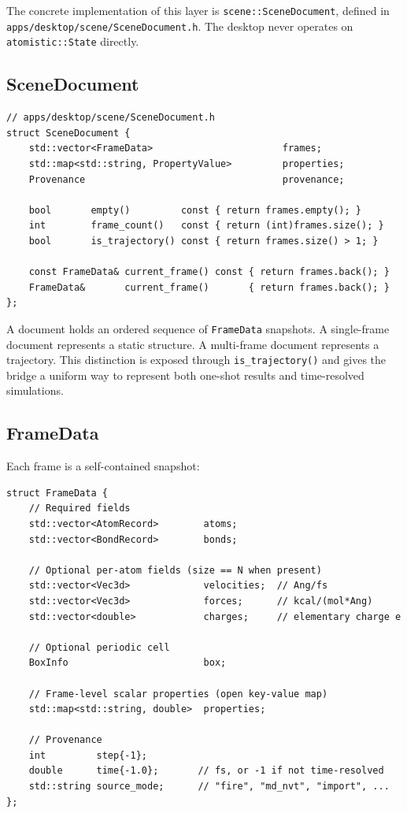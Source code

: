 ﻿\documentclass[11pt]{article}
\newcommand{\file}[1]{\texttt{#1}}
\newcommand{\type}[1]{\texttt{#1}}
\newcommand{\op}[1]{\texttt{#1}}
\begin{document}
The concrete implementation of this layer is \type{scene::SceneDocument},
defined in \file{apps/desktop/scene/SceneDocument.h}. The desktop never
operates on \type{atomistic::State} directly.

\subsection{SceneDocument}

\begin{lstlisting}
// apps/desktop/scene/SceneDocument.h
struct SceneDocument {
    std::vector<FrameData>                       frames;
    std::map<std::string, PropertyValue>         properties;
    Provenance                                   provenance;

    bool       empty()         const { return frames.empty(); }
    int        frame_count()   const { return (int)frames.size(); }
    bool       is_trajectory() const { return frames.size() > 1; }

    const FrameData& current_frame() const { return frames.back(); }
    FrameData&       current_frame()       { return frames.back(); }
};
\end{lstlisting}

A document holds an ordered sequence of \type{FrameData} snapshots. A
single-frame document represents a static structure. A multi-frame document
represents a trajectory. This distinction is exposed through
\op{is\_trajectory()} and gives the bridge a uniform way to represent both
one-shot results and time-resolved simulations.

\subsection{FrameData}

Each frame is a self-contained snapshot:

\begin{lstlisting}
struct FrameData {
    // Required fields
    std::vector<AtomRecord>        atoms;
    std::vector<BondRecord>        bonds;

    // Optional per-atom fields (size == N when present)
    std::vector<Vec3d>             velocities;  // Ang/fs
    std::vector<Vec3d>             forces;      // kcal/(mol*Ang)
    std::vector<double>            charges;     // elementary charge e

    // Optional periodic cell
    BoxInfo                        box;

    // Frame-level scalar properties (open key-value map)
    std::map<std::string, double>  properties;

    // Provenance
    int         step{-1};
    double      time{-1.0};       // fs, or -1 if not time-resolved
    std::string source_mode;      // "fire", "md_nvt", "import", ...
};
\end{lstlisting}
\end{document}
